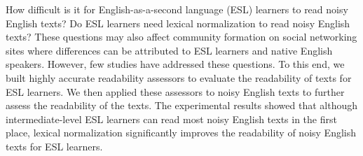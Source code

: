 How difficult is it for English-as-a-second language (ESL) learners to read noisy English texts? Do ESL learners need lexical normalization to read noisy English texts? These questions may also affect community formation on social networking sites where differences can be attributed to ESL learners and native English speakers. However, few studies have addressed these questions. To this end, we built highly accurate readability assessors to evaluate the readability of texts for ESL learners. We then applied these assessors to noisy English texts to further assess the readability of the texts. The experimental results showed that although intermediate-level ESL learners can read most noisy English texts in the first place, lexical normalization significantly improves the readability of noisy English texts for ESL learners.
